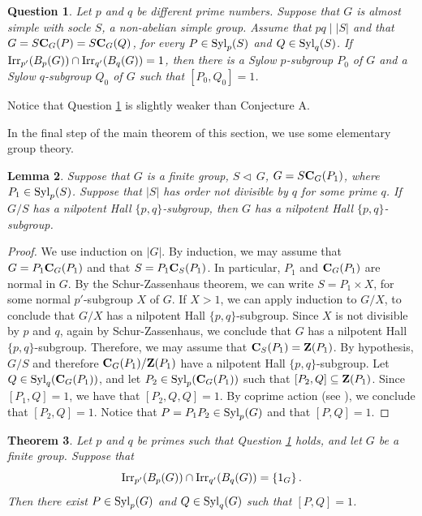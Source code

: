 \documentclass[12pt,leqno,a4paper]{amsart}
\def\syl#1#2{{\rm Syl}_#1(#2)}
\def\nor{\triangleleft\,}
\def\zent#1{{\bf Z}(#1)}
\def\cent#1#2{{\bf C}_{#1}(#2)}
\def\irrp#1#2{{\rm Irr}_{#1'}(#2)}
\def\sbs{\subseteq}
\newtheorem{thm}{Theorem}[section]
\newtheorem{lem}[thm]{Lemma}
\newtheorem{question}[thm]{Question}
\theoremstyle{remark}
\begin{document}
\begin{question}\label{questionalmostsimple}
Let $p$ and $q$ be different prime numbers.
Suppose that
 $G$ is almost simple with socle $S$, a non-abelian simple group. 
 Assume that  $pq\mid |S|$ and
 that  $G=S\cent G P=S\cent G Q$, for every $P\in{\rm Syl}_p(S)$ and $Q\in{\rm Syl}_q(S)$.
 If $\irrp{p}{B_p(G)} \cap  \irrp{q}{B_q(G)}=1$,
then there is a Sylow $p$-subgroup $P_0$
of $G$ and a Sylow $q$-subgroup $Q_0$ of $G$ such that $[P_0,Q_0]=1$.
\end{question}

 Notice that Question \ref{questionalmostsimple} is slightly weaker than Conjecture A.
 
 \medskip
 In the final step of the main theorem of this section, we use some elementary group theory.
 
 \begin{lem}\label{expla}
 Suppose that $G$ is a finite group, $S \nor G$, $G=S\cent G{P_1}$, where $P_1 \in \syl pS$.
 Suppose that $|S|$ has order not divisible by $q$ for some prime $q$. If $G/S$ has a nilpotent Hall
 $\{p,q\}$-subgroup, then $G$ has a nilpotent Hall $\{p,q\}$-subgroup.
  \end{lem}
  
  \begin{proof}
  We use induction on $|G|$.  By induction, we may assume that  $G=P_1\cent G{P_1}$ and that $S=P_1\cent S{P_1}$.
  In particular, $P_1$ and $\cent G{P_1}$ are normal in $G$. 
  By the Schur-Zassenhaus theorem, we can write $S=P_1 \times X$, for some normal $p'$-subgroup $X$ of $G$.
  If $X>1$, we can apply induction to $G/X$, to conclude that $G/X$ has a nilpotent Hall $\{p,q\}$-subgroup.
  Since $X$ is not divisible by $p$ and $q$, again by Schur-Zassenhaus, we conclude that $G$ has a nilpotent Hall $\{p,q\}$-subgroup.
  Therefore, we may assume that $\cent S{P_1}=\zent{P_1}$.
  By hypothesis, $G/S$ and therefore $\cent G{P_1}/\zent{P_1}$ have a nilpotent 
  Hall $\{p,q\}$-subgroup. Let $Q \in \syl q{\cent G{P_1}}$, and let $P_2 \in \syl p{\cent G{P_1}}$
  such that $[P_2, Q]\sbs \zent{P_1}$. Since $[P_1, Q]=1$, we have that $[P_2,Q,Q]=1$. By coprime action (see \cite[Lemma 4.29]{Is2}),
  we conclude that $[P_2, Q]=1$.
  Notice that $P=P_1P_2 \in \syl pG$ and that $[P,Q]=1$.  \end{proof}
 
\begin{thm}\label{thmreduction}
Let $p$ and $q$ be primes such that Question \ref{questionalmostsimple} holds, and let $G$ be a finite group.
 Suppose that $${\rm Irr}_{p'}(B_p(G))\cap {\rm Irr}_{q'}(B_q(G))=\{1_G\} \, .$$ Then there exist $P\in{\rm Syl}_p(G)$ and $Q\in{\rm Syl}_q(G)$ such that  $[P,Q]=1$. 
\end{thm}
\end{document}
